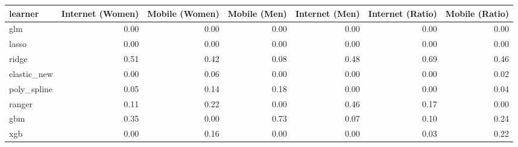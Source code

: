 \begin{table}[ht]
\centering
\begin{tabular}{lrrrrrr}
  \toprule
learner & Internet (Women) & Mobile (Women) & Mobile (Men) & Internet (Men) & Internet (Ratio) & Mobile (Ratio) \\ 
  \midrule
glm & 0.00 & 0.00 & 0.00 & 0.00 & 0.00 & 0.00 \\ 
  lasso & 0.00 & 0.00 & 0.00 & 0.00 & 0.00 & 0.00 \\ 
  ridge & 0.51 & 0.42 & 0.08 & 0.48 & 0.69 & 0.46 \\ 
  elastic\_new & 0.00 & 0.06 & 0.00 & 0.00 & 0.00 & 0.02 \\ 
  poly\_spline & 0.05 & 0.14 & 0.18 & 0.00 & 0.00 & 0.04 \\ 
  ranger & 0.11 & 0.22 & 0.00 & 0.46 & 0.17 & 0.00 \\ 
  gbm & 0.35 & 0.00 & 0.73 & 0.07 & 0.10 & 0.24 \\ 
  xgb & 0.00 & 0.16 & 0.00 & 0.00 & 0.03 & 0.22 \\ 
   \bottomrule
\end{tabular}
\end{table}
